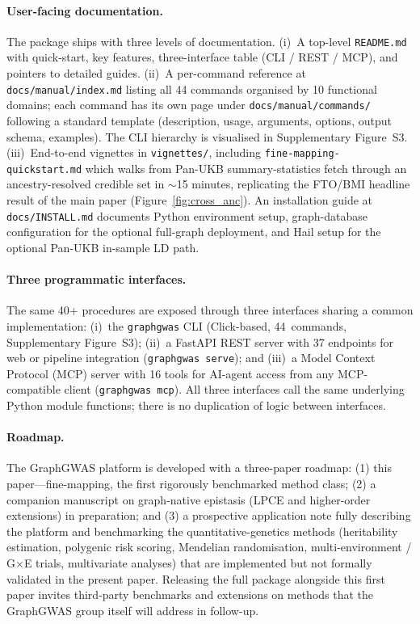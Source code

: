 \paragraph{User-facing documentation.}
The package ships with three levels of documentation. (i)~A
top-level \texttt{README.md} with quick-start, key features,
three-interface table (CLI / REST / MCP), and pointers to detailed
guides. (ii)~A per-command reference at \texttt{docs/manual/index.md}
listing all 44 commands organised by 10 functional domains; each
command has its own page under \texttt{docs/manual/commands/}
following a standard template (description, usage, arguments,
options, output schema, examples). The CLI hierarchy is visualised
in Supplementary Figure~S3. (iii)~End-to-end vignettes in
\texttt{vignettes/}, including \texttt{fine-mapping-quickstart.md}
which walks from Pan-UKB summary-statistics fetch through an
ancestry-resolved credible set in $\sim$15 minutes, replicating
the FTO/BMI headline result of the main paper (Figure~\ref{fig:cross_anc}). An
installation guide at \texttt{docs/INSTALL.md} documents Python
environment setup, graph-database configuration for the optional full-graph
deployment, and Hail setup for the optional Pan-UKB in-sample LD
path.

\paragraph{Three programmatic interfaces.}
The same 40+ procedures are exposed through three interfaces sharing
a common implementation: (i)~the \texttt{graphgwas} CLI (Click-based,
44~commands, Supplementary Figure~S3); (ii)~a FastAPI REST server
with 37 endpoints for web or pipeline integration
(\texttt{graphgwas serve}); and (iii)~a Model Context Protocol (MCP)
server with 16 tools for AI-agent access from any MCP-compatible
client (\texttt{graphgwas mcp}). All three interfaces call the
same underlying Python module functions; there is no duplication of
logic between interfaces.

\paragraph{Roadmap.}
The GraphGWAS platform is developed with a three-paper roadmap:
(1) this paper---fine-mapping, the first rigorously benchmarked
method class; (2) a companion manuscript on graph-native
epistasis (LPCE and higher-order extensions) in preparation; and
(3) a prospective application note fully describing the platform
and benchmarking the quantitative-genetics methods
(heritability estimation, polygenic risk scoring, Mendelian
randomisation, multi-environment / G$\times$E trials, multivariate
analyses) that are implemented
but not formally validated in the present paper. Releasing the
full package alongside this first paper invites third-party
benchmarks and extensions on methods that the GraphGWAS group
itself will address in follow-up.

